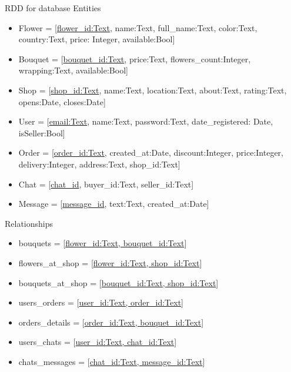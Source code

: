 \documentclass{scrreprt}
\begin{document}
RDD for database
Entities
\begin{itemize}
\item Flower = {[\underline{flower_id:Text}, name:Text, full_name:Text, color:Text, country:Text, price: Integer, available:Bool]}
\item Bouquet = {[\underline{bouquet_id:Text}, price:Text, flowers_count:Integer, wrapping:Text, available:Bool]}
\item Shop = {[\underline{shop_id:Text}, name:Text, location:Text, about:Text, rating:Text, opens:Date, closes:Date]} 
\item User = {[\underline{email:Text}, name:Text, password:Text, date_registered: Date, isSeller:Bool]}
\item Order = {[\underline{order_id:Text}, created_at:Date, discount:Integer, price:Integer, delivery:Integer, address:Text, shop_id:Text]}
\item Chat = {[\underline{chat_id}, buyer_id:Text, seller_id:Text]}
\item Message = {[\underline{message_id}, text:Text, created_at:Date]}
\end{itemize}

Relationships
\begin{itemize}

\item bouquets = {[\underline{flower_id:Text, bouquet_id:Text}]}

\item flowers_at_shop = {[\underline{flower_id:Text, shop_id:Text}]}

\item bouquets_at_shop = {[\underline{bouquet_id:Text, shop_id:Text}]}

\item users_orders = {[\underline{user_id:Text, order_id:Text}]}

\item orders_details = {[\underline{order_id:Text, bouquet_id:Text}]}

\item users_chats = {[\underline{user_id:Text, chat_id:Text}]}

\item chats_messages = {[\underline{chat_id:Text, message_id:Text}]}

\end{itemize}
\end{document}
